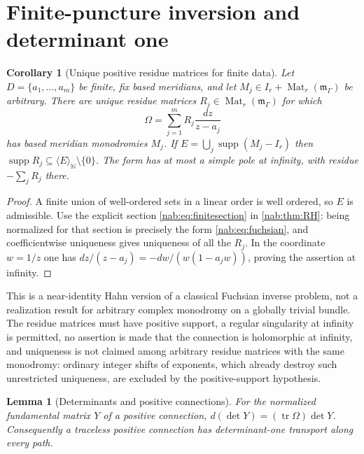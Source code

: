 \documentclass[11pt,letterpaper]{article}
\newtheorem{lemma}[lemma]{Lemma}
\newtheorem{corollary}[corollary]{Corollary}
\theoremstyle{definition}
\theoremstyle{remark}
\newcommand{\N}{\mathbb N}
\newcommand{\mm}{\mathfrak m_\Gamma}
\newcommand{\Mat}{\operatorname{Mat}}
\newcommand{\supp}{\operatorname{supp}}
\newcommand{\tr}{\operatorname{tr}}
\newcommand{\angles}[1]{\langle #1\rangle_{\N}}
\numberwithin{equation}{section}
\begin{document}
\section{Finite-puncture inversion and determinant one}\label{nab:sec:sl}

\begin{corollary}[Unique positive residue matrices for finite data]
\label{nab:cor:finite}
Let $D=\{a_1,\ldots,a_m\}$ be finite, fix based meridians, and let
$M_j\in I_r+\Mat_r(\mm)$ be arbitrary. There are unique residue matrices
$R_j\in\Mat_r(\mm)$ for which
\begin{equation}\label{nab:eq:fuchsian}
 \Omega=\sum_{j=1}^mR_j\frac{dz}{z-a_j}
\end{equation}
has based meridian monodromies $M_j$. If $E=\bigcup_j\supp(M_j-I_r)$ then
$\supp R_j\subseteq\angles E\setminus\{0\}$. The form has at most a simple pole
at infinity, with residue $-\sum_jR_j$ there.
\end{corollary}

\begin{proof}
A finite union of well-ordered sets in a linear order is well ordered, so $E$
is admissible. Use the explicit section \eqref{nab:eq:finitesection} in
\cref{nab:thm:RH}: being normalized for that section is precisely the form
\eqref{nab:eq:fuchsian}, and coefficientwise uniqueness gives uniqueness of all
the $R_j$. In the coordinate $w=1/z$ one has
$dz/(z-a_j)=-dw/(w(1-a_jw))$, proving the assertion at infinity.
\end{proof}

This is a near-identity Hahn version of a classical Fuchsian inverse problem,
not a realization result for arbitrary complex monodromy on a globally trivial
bundle. The residue matrices must have positive support, a regular singularity
at infinity is permitted, no assertion is made that the connection is
holomorphic at infinity, and uniqueness is not claimed among arbitrary residue
matrices with the same monodromy: ordinary integer shifts of exponents, which
already destroy such unrestricted uniqueness, are excluded by the
positive-support hypothesis.

\begin{lemma}[Determinants and positive connections]\label{nab:lem:det}
For the normalized fundamental matrix $Y$ of a positive connection,
$d(\det Y)=(\tr\Omega)\det Y$. Consequently a traceless positive connection
has determinant-one transport along every path.
\end{lemma}
\end{document}

